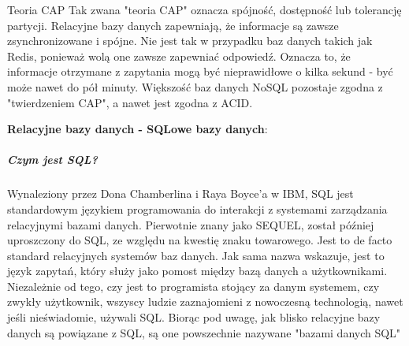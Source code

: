 \documentclass[12pt, a4paper, twoside, openany]{book}
\begin{document}
Teoria CAP
Tak zwana "teoria CAP" oznacza spójność, dostępność lub tolerancję partycji. Relacyjne bazy danych zapewniają, że informacje są zawsze zsynchronizowane i spójne. Nie jest tak w przypadku baz danych takich jak Redis, ponieważ wolą one zawsze zapewniać odpowiedź. Oznacza to, że informacje otrzymane z zapytania mogą być nieprawidłowe o kilka sekund - być może nawet do pół minuty. Większość baz danych NoSQL pozostaje zgodna z "twierdzeniem CAP", a nawet jest zgodna z ACID.

\textbf{Relacyjne bazy danych - SQLowe bazy danych}:\\
\subparagraph*{Czym jest SQL?\\}
Wynaleziony przez Dona Chamberlina i Raya Boyce'a w IBM, SQL jest standardowym językiem programowania do interakcji z systemami zarządzania relacyjnymi bazami danych. Pierwotnie znany jako SEQUEL, został później uproszczony do SQL, ze względu na kwestię znaku towarowego. Jest to de facto standard relacyjnych systemów baz danych. Jak sama nazwa wskazuje, jest to język zapytań, który służy jako pomost między bazą danych a użytkownikami. Niezależnie od tego, czy jest to programista stojący za danym systemem, czy zwykły użytkownik, wszyscy ludzie zaznajomieni z nowoczesną technologią, nawet jeśli nieświadomie, używali SQL. Biorąc pod uwagę, jak blisko relacyjne bazy danych są powiązane z SQL, są one powszechnie nazywane "bazami danych SQL"
\end{document}

